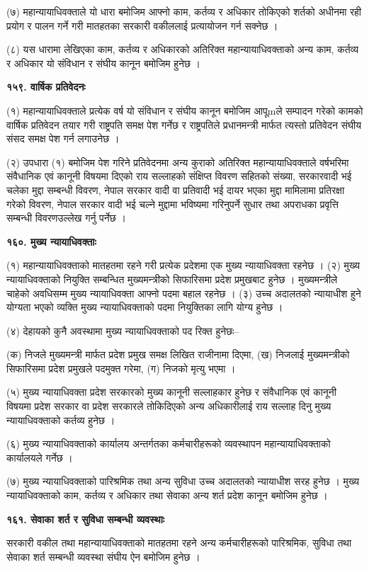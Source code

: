 (७) महान्यायाधिवक्ताले यो धारा बमोजिम आफ्नो काम, कर्तव्य र अधिकार तोकिएको शर्तको अधीनमा रही प्रयोग र पालन गर्ने गरी मातहतका सरकारी वकीललाई प्रत्यायोजन गर्न सक्नेछ ।

(८) यस धारामा लेखिएका काम, कर्तव्य र अधिकारको अतिरिक्त महान्यायाधिवक्ताको अन्य काम, कर्तव्य र अधिकार यो संविधान र संघीय कानून बमोजिम हुनेछ ।

\textbf{१५९. वार्षिक प्रतिवेदनः}

(१) महान्यायाधिवक्ताले प्रत्येक वर्ष यो संविधान र संघीय कानून बमोजिम आपूmले सम्पादन गरेको कामको वार्षिक प्रतिवेदन तयार गरी
राष्ट्रपति समक्ष पेश गर्नेछ र राष्ट्रपतिले प्रधानमन्त्री मार्फत त्यस्तो प्रतिवेदन संघीय संसद समक्ष पेश गर्न लगाउनेछ ।

(२) उपधारा (१) बमोजिम पेश गरिने प्रतिवेदनमा अन्य कुराको अतिरिक्त महान्यायाधिवक्ताले वर्षभरिमा संवैधानिक एवं कानूनी विषयमा दिएको राय सल्लाहको संक्षिप्त विवरण सहितको संख्या, सरकारवादी भई चलेका मुद्दा सम्बन्धी विवरण, नेपाल सरकार वादी वा प्रतिवादी भई दायर भएका मुद्दा मामिलामा प्रतिरक्षा गरेको विवरण, नेपाल सरकार वादी भई चल्ने मुद्दामा भविष्यमा गरिनुपर्ने सुधार तथा अपराधका प्रवृत्ति सम्बन्धी विवरणउल्लेख गर्नु पर्नेछ ।

\textbf{१६०. मुख्य न्यायाधिवक्ताः}

(१) महान्यायाधिवक्ताको मातहतमा रहने गरी प्रत्येक प्रदेशमा एक मुख्य न्यायाधिवक्ता रहनेछ ।
(२) मुख्य न्यायाधिवक्ताको नियुक्ति सम्बन्धित मुख्यमन्त्रीको सिफारिसमा प्रदेश प्रमुखबाट हुनेछ । मुख्यमन्त्रीले चाहेको अवधिसम्म मुख्य न्यायाधिवक्ता आफ्नो पदमा बहाल रहनेछ ।
(३) उच्च अदालतको न्यायाधीश हुने योग्यता भएको व्यक्ति मुख्य न्यायाधिवक्ताको पदमा नियुक्तिका लागि योग्य हुनेछ ।

(४) देहायको कुनै अवस्थामा मुख्य न्यायाधिवक्ताको पद रिक्त हुनेछः–

(क) निजले मुख्यमन्त्री मार्फत प्रदेश प्रमुख समक्ष लिखित राजीनामा दिएमा,
(ख) निजलाई मुख्यमन्त्रीको सिफारिसमा प्रदेश प्रमुखले पदमुक्त गरेमा,
(ग) निजको मृत्यु भएमा ।

(५) मुख्य न्यायाधिवक्ता प्रदेश सरकारको मुख्य कानूनी सल्लाहकार हुनेछ र संवैधानिक एवं कानूनी विषयमा प्रदेश सरकार वा प्रदेश सरकारले तोकिदिएको अन्य अधिकारीलाई राय सल्लाह दिनु मुख्य न्यायाधिवक्ताको कर्तव्य हुनेछ ।

(६) मुख्य न्यायाधिवक्ताको कार्यालय अन्तर्गतका कर्मचारीहरूको व्यवस्थापन महान्यायाधिवक्ताको कार्यालयले गर्नेछ ।

(७) मुख्य न्यायाधिवक्ताको पारिश्रमिक तथा अन्य सुविधा उच्च अदालतको न्यायाधीश सरह हुनेछ । मुख्य न्यायाधिवक्ताको काम, कर्तव्य र अधिकार तथा सेवाका अन्य शर्त प्रदेश कानून बमोजिम हुनेछ ।

\textbf{१६१. सेवाका शर्त र सुविधा सम्बन्धी व्यवस्थाः}

सरकारी वकील तथा महान्यायाधिवक्ताको मातहतमा रहने अन्य कर्मचारीहरूको पारिश्रमिक, सुविधा तथा सेवाका शर्त सम्बन्धी व्यवस्था संघीय ऐन बमोजिम हुनेछ ।